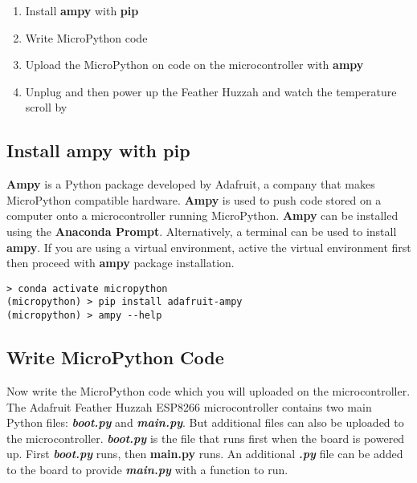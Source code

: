\documentclass{book}
\providecommand{\tightlist}{%
      \setlength{\itemsep}{0pt}\setlength{\parskip}{0pt}}
\begin{document}
    
        \begin{enumerate}
\def\labelenumi{\arabic{enumi}.}
\tightlist
\item
  Install \textbf{ampy} with \textbf{pip}
\item
  Write MicroPython code
\item
  Upload the MicroPython on code on the microcontroller with
  \textbf{ampy}
\item
  Unplug and then power up the Feather Huzzah and watch the temperature
  scroll by
\end{enumerate}
    




    
        \hypertarget{install-ampy-with-pip}{%
\subsection{Install ampy with pip}\label{install-ampy-with-pip}}

\textbf{Ampy} is a Python package developed by Adafruit, a company that
makes MicroPython compatible hardware. \textbf{Ampy} is used to push
code stored on a computer onto a microcontroller running MicroPython.
\textbf{Ampy} can be installed using the \textbf{Anaconda Prompt}.
Alternatively, a terminal can be used to install \textbf{ampy}. If you
are using a virtual environment, active the virtual environment first
then proceed with \textbf{ampy} package installation.
    




    
        \begin{lstlisting}
> conda activate micropython
(micropython) > pip install adafruit-ampy
(micropython) > ampy --help
\end{lstlisting}
    




    
        \hypertarget{write-micropython-code}{%
\subsection{Write MicroPython Code}\label{write-micropython-code}}
    




    
        Now write the MicroPython code which you will uploaded on the
microcontroller. The Adafruit Feather Huzzah ESP8266 microcontroller
contains two main Python files: \textbf{\emph{boot.py}} and
\textbf{\emph{main.py}}. But additional files can also be uploaded to
the microcontroller. \textbf{\emph{boot.py}} is the file that runs first
when the board is powered up. First \textbf{\emph{boot.py}} runs, then
\textbf{main.py} runs. An additional \textbf{\emph{.py}} file can be
added to the board to provide \textbf{\emph{main.py}} with a function to
run.
\end{document}
